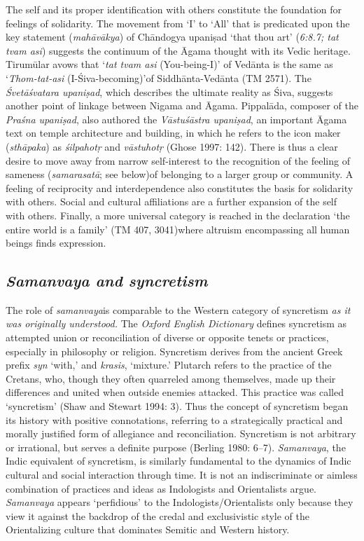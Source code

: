 The self and its proper identification with others constitute the foundation for feelings of solidarity. The movement from ‘I’ to ‘All’ that is predicated upon the key statement (\textit{mahāvākya}) of Chāndogya upaniṣad ‘that thou art’ (\textit{6:8.7; tat tvam asi}) suggests the continuum of the Āgama thought with its Vedic heritage. Tirumūlar avows that ‘\textit{tat tvam asi} (You-being-I)’ of Vedānta is the same as ‘\textit{Thom-tat-asi} (I-Śiva-becoming)’of Siddhānta-Vedānta (TM 2571). The \textit{Śvetāśvatara upaniṣad}, which describes the ultimate reality as Śiva, suggests another point of linkage between Nigama and Āgama. Pippalāda, composer of the \textit{Praśna upaniṣad}, also authored the \textit{Vāstuśāstra upaniṣad}, an important Āgama text on temple architecture and building, in which he refers to the icon maker (\textit{sthāpaka}) as \textit{śilpahotṛ} and \textit{vāstuhotṛ} (Ghose 1997: 142). There is thus a clear desire to move away from narrow self-interest to the recognition of the feeling of sameness (\textit{samarasatā}; see below)of belonging to a larger group or community. A feeling of reciprocity and interdependence also constitutes the basis for solidarity with others. Social and cultural affiliations are a further expansion of the self with others. Finally, a more universal category is reached in the declaration ‘the entire world is a family’ (TM 407, 3041)where altruism encompassing all human beings finds expression.

\newpage


\subsection*{\textit{Samanvaya and syncretism}}

The role of \textit{samanvaya}is comparable to the Western category of syncretism \textit{as it was originally understood.} The \textit{Oxford English Dictionary} defines syncretism as attempted union or reconciliation of diverse or opposite tenets or practices, especially in philosophy or religion. Syncretism derives from the ancient Greek prefix \textit{syn} ‘with,’ and \textit{krasis}, ‘mixture.’ Plutarch refers to the practice of the Cretans, who, though they often quarreled among themselves, made up their differences and united when outside enemies attacked. This practice was called ‘syncretism’ (Shaw and Stewart 1994: 3). Thus the concept of syncretism began its history with positive connotations, referring to a strategically practical and morally justified form of allegiance and reconciliation. Syncretism is not arbitrary or irrational, but serves a definite purpose (Berling 1980: 6–7). \textit{Samanvaya}, the Indic equivalent of syncretism, is similarly fundamental to the dynamics of Indic cultural and social interaction through time. It is not an indiscriminate or aimless combination of practices and ideas as Indologists and Orientalists argue. \textit{Samanvaya} appears ‘perfidious’ to the Indologists/Orientalists only because they view it against the backdrop of the credal and exclusivistic style of the Orientalizing culture that dominates Semitic and Western history.


